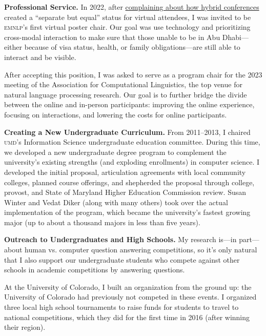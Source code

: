 \documentclass[11pt]{amsart}
\newcommand{\abr}[1]{\textsc{#1}}
\begin{document}
{\bf Professional Service.}
%
In 2022, after
\href{https://www.youtube.com/watch?v=3gSgNXGxzQU}{complaining about
  how hybrid conferences} created a ``separate but equal'' status for
virtual attendees, I was invited to be \abr{emnlp}'s first virtual
poster chair.
%
Our goal was use technology and prioritizing cross-modal interaction
to make sure that those unable to be in Abu Dhabi---either because of
visa status, health, or family obligations---are still able to
interact and be visible.

After accepting this position, I was asked to serve as a program chair for the
2023 meeting of the Association for Computational Linguistics, the top venue
for natural language processing research.
%
Our goal is to further bridge the divide between the online and in-person
participants: improving the online experience, focusing on interactions, and
lowering the costs for online participants.



{\bf Creating a New Undergraduate Curriculum.}
%
From 2011--2013, I chaired \abr{umd}'s Information Science
undergraduate education committee. During this time, we developed a
new undergraduate degree program to complement the university's
existing strengths (and exploding enrollments) in computer science. I
developed the initial proposal, articulation agreements with local
community colleges, planned course offerings, and shepherded the
proposal through college, provost, and State of Maryland Higher
Education Commission review.
%
Susan Winter and Vedat Diker (along with many others) took over the actual
implementation of the program, which became the university's fastest growing
major (up to about a thousand majors in less than five years).


{\bf Outreach to Undergraduates and High Schools.}
My research is---in part---about human vs. computer question answering
competitions, so it's only natural that I also support our
undergraduate students who compete against other schools in academic
competitions by answering questions.

At the University of Colorado, I built an organization
from the ground up: the University of Colorado had previously not
competed in these events.
%
I organized three local high school tournaments to raise funds for 
students to travel to national competitions, which
they did for the first time in 2016 (after winning their region).
\end{document}
